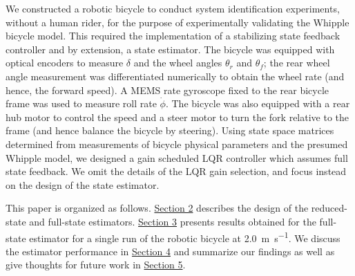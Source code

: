 \documentclass[letterpaper,11pt]{article}
\begin{document}
We constructed a robotic bicycle to conduct system identification experiments,
without a human rider, for the purpose of experimentally validating the Whipple
bicycle model\cite{Peterson2013}. This required the implementation of a
stabilizing state feedback controller and by extension, a state estimator. The
bicycle was equipped with optical encoders to measure $\delta$ and the wheel
angles $\theta_r$ and $\theta_f$; the rear wheel angle measurement was
differentiated numerically to obtain the wheel rate (and hence, the forward
speed). A MEMS rate gyroscope fixed to the rear bicycle frame was used to
measure roll rate $\dot{\phi}$. The bicycle was also equipped with a rear hub
motor to control the speed and a steer motor to turn the fork relative to the
frame (and hence balance the bicycle by steering). Using state space matrices
determined from measurements of bicycle physical parameters and the presumed
Whipple model, we designed a gain scheduled LQR controller which assumes full
state feedback. We omit the details of the LQR gain selection, and focus
instead on the design of the state estimator.

This paper is organized as follows. \hyperref[sec:methods]{Section 2} describes
the design of the reduced-state and full-state estimators.
\hyperref[sec:results]{Section 3} presents results obtained for the full-state
estimator for a single run of the robotic bicycle at \SI{2.0}{\m\per\s}. We
discuss the estimator performance in \hyperref[sec:discussion]{Section 4} and
summarize our findings as well as give thoughts for future work in
\hyperref[sec:conclusion]{Section 5}.
\end{document}

